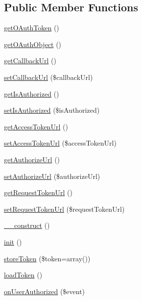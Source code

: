 \subsection*{Public Member Functions}
\begin{DoxyCompactItemize}
\item 
\hyperlink{classCXLOAuthBehavior_ab427c5f1592fd568bb84a7fef22bf980}{getOAuthToken} ()
\item 
\hyperlink{classCXLOAuthBehavior_a13fb41e10ef1a77aacb14d33ac1ce1be}{getOAuthObject} ()
\item 
\hyperlink{classCXLOAuthBehavior_a10b40817a4c75a202a41511d31629e6c}{getCallbackUrl} ()
\item 
\hyperlink{classCXLOAuthBehavior_a3a3fa8cd95b6783dcde3d34a7237022e}{setCallbackUrl} (\$callbackUrl)
\item 
\hyperlink{classCXLOAuthBehavior_a9b29f2f3559502dcbd1c3c202eb5230e}{getIsAuthorized} ()
\item 
\hyperlink{classCXLOAuthBehavior_af7249190812071dfa47a42f5901382f0}{setIsAuthorized} (\$isAuthorized)
\item 
\hyperlink{classCXLOAuthBehavior_a65444343b71d28e0f96b3e4c60b8a393}{getAccessTokenUrl} ()
\item 
\hyperlink{classCXLOAuthBehavior_ae25193177398cc0288403065233889a1}{setAccessTokenUrl} (\$accessTokenUrl)
\item 
\hyperlink{classCXLOAuthBehavior_a94d630cf8cc55a8a7929862d81e3a6ab}{getAuthorizeUrl} ()
\item 
\hyperlink{classCXLOAuthBehavior_a3ba92cd03bf24fc76d4a65fe8078f2c1}{setAuthorizeUrl} (\$authorizeUrl)
\item 
\hyperlink{classCXLOAuthBehavior_a414cc1ac9b3577270afe51ca2405d6f2}{getRequestTokenUrl} ()
\item 
\hyperlink{classCXLOAuthBehavior_a192e5b1f622540ab290191f33fa52d49}{setRequestTokenUrl} (\$requestTokenUrl)
\item 
\hyperlink{classCXLOAuthBehavior_a095c5d389db211932136b53f25f39685}{\_\-\_\-construct} ()
\item 
\hyperlink{classCXLOAuthBehavior_a4be4055f3361d4800e16bc2e2e38cda6}{init} ()
\item 
\hyperlink{classCXLOAuthBehavior_a8027c4853ebf41108725eb798ebfcd59}{storeToken} (\$token=array())
\item 
\hyperlink{classCXLOAuthBehavior_a5126349c471fcaff1a74b9d117b979b1}{loadToken} ()
\item 
\hyperlink{classCXLOAuthBehavior_aeea17b8cf4b07497f4c9a4d5462c752a}{onUserAuthorized} (\$event)
\end{DoxyCompactItemize}

